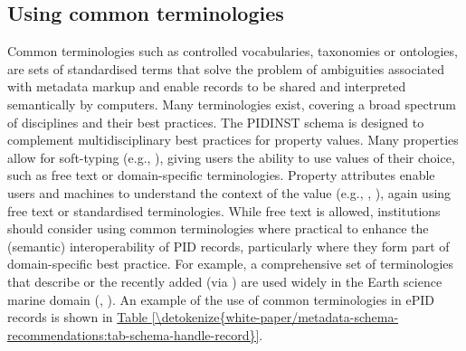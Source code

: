 \documentclass[a4paper,10pt,english]{sphinxmanual}
\begin{document}
\subsection{Using common terminologies}
\label{\detokenize{white-paper/metadata-schema-recommendations:using-common-terminologies}}\label{\detokenize{white-paper/metadata-schema-recommendations:pidinst-metadata-schema-terminologies}}
Common terminologies such as controlled vocabularies, taxonomies or
ontologies, are sets of standardised terms that solve the problem of
ambiguities associated with metadata markup and enable records to be
shared and interpreted semantically by computers. Many terminologies
exist, covering a broad spectrum of disciplines and their best
practices. The PIDINST schema is designed to complement
multidisciplinary best practices for property values. Many properties
allow for soft-typing (e.g., ), giving users the ability to
use values of their choice, such as free text or domain-specific
terminologies. Property attributes enable users and machines to
understand the context of the value (e.g., ,
), again using free text or standardised
terminologies. While free text is allowed, institutions should consider
using common terminologies where practical to enhance the (semantic)
interoperability of PID records, particularly where they form part of
domain-specific best practice. For example, a comprehensive set of
terminologies that describe  or the recently added
 (via ) are used widely in the Earth science
marine domain (,
).
An example of the use of common terminologies in ePID records is shown
in \hyperref[\detokenize{white-paper/metadata-schema-recommendations:tab-schema-handle-record}]{Table \ref{\detokenize{white-paper/metadata-schema-recommendations:tab-schema-handle-record}}}.
\end{document}
